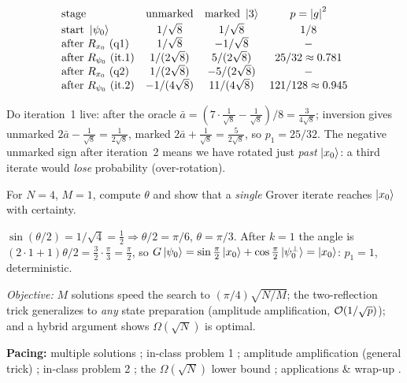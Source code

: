 \documentclass[11pt]{article}
\begin{document}
\begin{board}
\[
\begin{array}{lccc}
\text{stage} & \text{unmarked} & \text{marked }\ket3 & p=\left\lvert g \right\rvert^2\\[2pt]
\text{start }\ket{\psi_0} & 1/\sqrt8 & 1/\sqrt8 & 1/8\\
\text{after }R_{x_0}\ (\text{q1}) & 1/\sqrt8 & -1/\sqrt8 & -\\
\text{after }R_{\psi_0}\ (\text{it.1}) & 1/(2\sqrt8) & 5/(2\sqrt8) & 25/32\approx0.781\\
\text{after }R_{x_0}\ (\text{q2}) & 1/(2\sqrt8) & -5/(2\sqrt8) & -\\
\text{after }R_{\psi_0}\ (\text{it.2}) & -1/(4\sqrt8) & 11/(4\sqrt8) & 121/128\approx0.945
\end{array}
\]
\end{board}

Do iteration~1 live: after the oracle $\bar a=(7\cdot\tfrac1{\sqrt8}-\tfrac1{\sqrt8})/8
=\tfrac{3}{4\sqrt8}$; inversion gives unmarked $2\bar a-\tfrac1{\sqrt8}=\tfrac1{2\sqrt8}$,
marked $2\bar a+\tfrac1{\sqrt8}=\tfrac5{2\sqrt8}$, so $p_1=25/32$. The negative
unmarked sign after iteration~2 means we have rotated just \emph{past} $\ket{x_0}$: a
third iterate would \emph{lose} probability (over-rotation).

\begin{inclass}[Grover on $N=4$ is exact]\label{ic:l3-n4}
For $N=4$, $M=1$, compute $\theta$ and show that a \emph{single} Grover iterate
reaches $\ket{x_0}$ with certainty.
\end{inclass}
\begin{answer}
$\sin(\theta/2)=1/\sqrt4=\tfrac12\Rightarrow\theta/2=\pi/6$, $\theta=\pi/3$. After
$k=1$ the angle is $(2\cdot1+1)\theta/2=\tfrac{3}{2}\cdot\tfrac\pi3=\tfrac\pi2$, so
$G\ket{\psi_0}=\sin\tfrac\pi2\ket{x_0}+\cos\tfrac\pi2\ket{\psi_0^\perp}=\ket{x_0}$:
$p_1=1$, deterministic. \checkmark
\end{answer}

\noindent\emph{Objective:} $M$ solutions speed the search to $(\pi/4)\sqrt{N/M}$;
the two-reflection trick generalizes to \emph{any} state preparation (amplitude
amplification, $\mathcal{O}(1/\sqrt p)$); and a hybrid argument shows $\Omega(\sqrt N)$ is
optimal.

\medskip
\noindent\textbf{Pacing:} multiple solutions ; in-class problem 1
; amplitude amplification (general trick) ; in-class problem 2
; the $\Omega(\sqrt N)$ lower bound ; applications \& wrap-up
.
\end{document}
